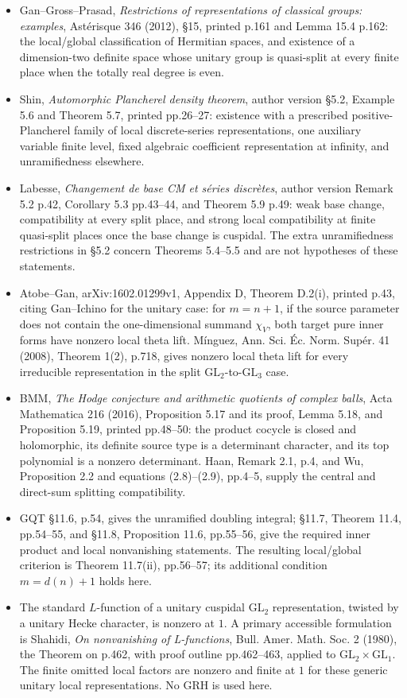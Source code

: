 \begin{itemize}
\tightlist
\item
  Gan--Gross--Prasad, \emph{Restrictions of representations of classical groups: examples}, Astérisque 346 (2012), §15, printed p.161 and Lemma 15.4 p.162: the local/global classification of Hermitian spaces, and existence of a dimension-two definite space whose unitary group is quasi-split at every finite place when the totally real degree is even.
\item
  Shin, \emph{Automorphic Plancherel density theorem}, author version §5.2, Example 5.6 and Theorem 5.7, printed pp.26--27: existence with a prescribed positive-Plancherel family of local discrete-series representations, one auxiliary variable finite level, fixed algebraic coefficient representation at infinity, and unramifiedness elsewhere.
\item
  Labesse, \emph{Changement de base CM et séries discrètes}, author version Remark 5.2 p.42, Corollary 5.3 pp.43--44, and Theorem 5.9 p.49: weak base change, compatibility at every split place, and strong local compatibility at finite quasi-split places once the base change is cuspidal. The extra unramifiedness restrictions in §5.2 concern Theorems 5.4--5.5 and are not hypotheses of these statements.
\item
  Atobe--Gan, arXiv:1602.01299v1, Appendix D, Theorem D.2(i), printed p.43, citing Gan--Ichino for the unitary case: for \(m=n+1\), if the source parameter does not contain the one-dimensional summand \(\chi_V\), both target pure inner forms have nonzero local theta lift. Mínguez, Ann. Sci. Éc. Norm. Supér. 41 (2008), Theorem 1(2), p.718, gives nonzero local theta lift for every irreducible representation in the split \(\mathrm{GL}_2\)-to-\(\mathrm{GL}_3\) case.
\item
  BMM, \emph{The Hodge conjecture and arithmetic quotients of complex balls}, Acta Mathematica 216 (2016), Proposition 5.17 and its proof, Lemma 5.18, and Proposition 5.19, printed pp.48--50: the product cocycle is closed and holomorphic, its definite source type is a determinant character, and its top polynomial is a nonzero determinant. Haan, Remark 2.1, p.4, and Wu, Proposition 2.2 and equations (2.8)--(2.9), pp.4--5, supply the central and direct-sum splitting compatibility.
\item
  GQT §11.6, p.54, gives the unramified doubling integral; §11.7, Theorem 11.4, pp.54--55, and §11.8, Proposition 11.6, pp.55--56, give the required inner product and local nonvanishing statements. The resulting local/global criterion is Theorem 11.7(ii), pp.56--57; its additional condition \(m=d(n)+1\) holds here.
\item
  The standard \(L\)-function of a unitary cuspidal \(\mathrm{GL}_2\) representation, twisted by a unitary Hecke character, is nonzero at \(1\). A primary accessible formulation is Shahidi, \emph{On nonvanishing of L-functions}, Bull. Amer. Math. Soc. 2 (1980), the Theorem on p.462, with proof outline pp.462--463, applied to \(\mathrm{GL}_2\times\mathrm{GL}_1\). The finite omitted local factors are nonzero and finite at \(1\) for these generic unitary local representations. No GRH is used here.
\end{itemize}

